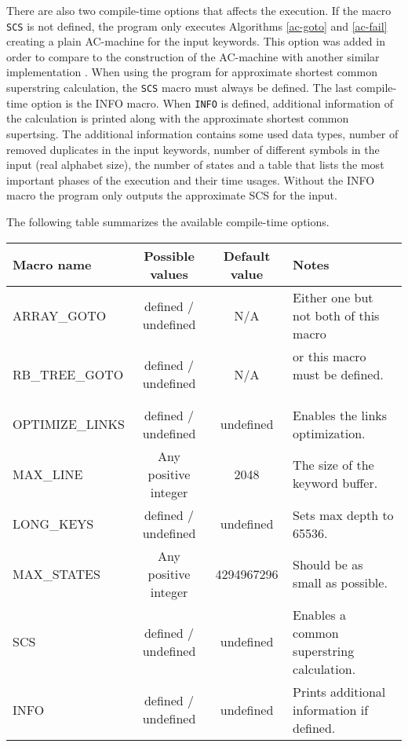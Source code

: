 \documentclass[english,twoside,censored,csm,algorithms-track-2020]{HYthesisML}
\theoremstyle{plain}
\theoremstyle{definition}
\begin{document}
There are also two compile-time options that affects the execution. If the macro \texttt{SCS}
is not defined,
the program only executes Algorithms \ref{ac-goto} and \ref{ac-fail} creating a plain AC-machine
for the input keywords. This option was added in order to compare to the construction of the
AC-machine with another similar implementation \citep{Salmela}. When using the program for approximate
shortest common superstring calculation, the \texttt{SCS} macro must always be defined. The last
compile-time option is the INFO macro. When \texttt{INFO} is defined, additional information
of the calculation
is printed along with the approximate shortest common supertsing. The additional information contains
some used data types, number of removed duplicates in the input keywords, number of different symbols
in the input (real alphabet size), the number of states and a table that lists the most important
phases of the execution and their time usages. Without the INFO macro the program only outputs
the approximate SCS for the input.

The following table summarizes the available compile-time options.\\

\hspace{-1.7cm}
  \begin{tabular}{ |l|c|c|l| }
    \hline
    \textbf{Macro name} & \textbf{Possible values} & \textbf{Default value} & \textbf{Notes} \\
 \hline
 ARRAY\_GOTO & defined / undefined & N/A & Either one but not both of this macro \\
 RB\_TREE\_GOTO & defined / undefined & N/A & or this macro must be defined. ~~~ \\
 OPTIMIZE\_LINKS & defined / undefined  & undefined & Enables the links optimization.\\
 MAX\_LINE & Any positive integer & 2048 & The size of the keyword buffer. \\
 LONG\_KEYS & defined / undefined & undefined & Sets max depth to 65536. \\
 MAX\_STATES & Any positive integer & 4294967296 & Should be as small as possible. \\
 SCS & defined / undefined & undefined & Enables a common superstring calculation. \\
 INFO & defined / undefined & undefined & Prints additional information if defined.\\
 \hline
  \end{tabular}
\end{document}
